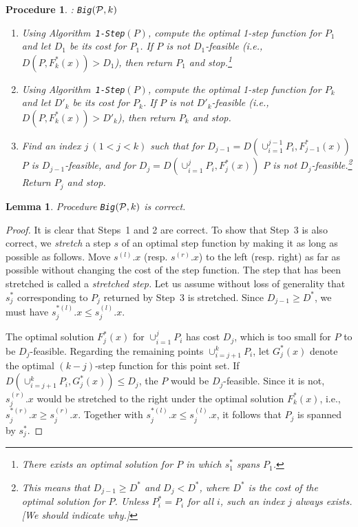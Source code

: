 \documentclass[preprint,10pt]{elsarticle}
\newtheorem{lemma}{Lemma}
\newtheorem{procedure}{Procedure}
\begin{document}
\begin{procedure}{\rm :} {\tt Big$({\cal P}, k)$}\label{proc:bigk}

\noindent
\begin{enumerate}
\item
Using Algorithm~{\tt 1-Step}$(P)$, compute the optimal 1-step function for $P_1$
and let $D_1$ be its cost for $P_1$.
If $P$ is not $D_1$-feasible (i.e., $D(P,F^*_{k}(x))>D_1$),
then return $P_1$ and stop.\footnote{There exists an optimal solution for $P$
 in which $s^*_1$ spans $P_1$.}
\item
Using Algorithm~{\tt 1-Step}$(P)$, compute the optimal 1-step function for $P_k$
and let $D'_k$ be its cost for $P_k$.
If $P$ is not $D'_k$-feasible (i.e., $D(P,F^*_{k}(x))>D'_k$),
then return $P_k$ and stop.
\item
Find an index $j~ (1 < j < k)$ such that for $D_{j-1}=D(\cup_{i=1}^{j-1} P_i, F^*_{j-1}(x))$
$P$ is $D_{j-1}$-feasible, 
and for $D_j=D(\cup_{i=1}^{j} P_i, F^*_j(x))$ $P$ is not $D_{j}$-feasible.\footnote{This means
that $D_{j-1}\geq D^*$ and $D_{j}< D^*$,
where $D^*$ is the cost of the optimal solution for $P$.
Unless $P^*_i =P_i$ for all $i$, such an index $j$ always exists.
[We should indicate why.]}
Return $P_j$ and stop.
\end{enumerate}
\end{procedure}

\begin{lemma}\label{lem:Bigiscorrect}
Procedure {\tt Big$({\cal P},k)$} is correct.
\end{lemma}
\begin{proof}
It is clear that Steps~1 and 2 are correct.
To show that Step~3 is also correct, 
we {\em stretch} a step $s$ of an optimal step function
by making it as long as possible as follows.
Move $s^{(l)}.x$ (resp. $s^{(r)}.x$) to the left (resp. right) as far as possible without changing the cost
of the step function.
The step that has been stretched is called a {\em stretched step.} 
Let us assume without loss of generality that $s^*_j$ corresponding to $P_j$ returned by Step~3 is stretched.
Since $D_{j-1}\geq D^*$,
we must have $s^{*(l)}_j.x \leq s^{(l)}_j.x$.

The optimal solution $F^*_j(x)$ for $\cup_{i=1}^j P_i$ has cost $D_j$,
which is too small for $P$ to be $D_j$-feasible.
Regarding the remaining points $\cup_{i=j+1}^k P_i$,
let $G^*_j(x)$ denote the optimal $(k-j)$-step function for this point set.
If $D(\cup_{i=j+1}^k P_i, G^*_j(x)) \leq D_j$,
the $P$ would be $D_j$-feasible.
Since it is not,
 $s^{(r)}_j.x$ would be stretched to the right under the optimal solution $F^*_k(x)$,
i.e., $s^{*(r)}_j.x \geq s^{(r)}_j.x$.
Together with $s^{*(l)}_j.x \leq s^{(l)}_j.x$,
it follows that $P_j$ is spanned by $s^*_j$.
\end{proof}
\end{document}
